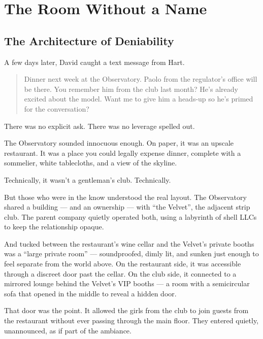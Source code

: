 
\section{The Room Without a Name}

\subsection{The Architecture of Deniability}

A few days later, David caught a text message from Hart.

\begin{quote}
  Dinner next week at the Observatory. Paolo from the regulator’s office will be there. You remember him from the club 
  last month? He’s already excited about the model. Want me to give him a heads-up so he’s primed for the conversation?
\end{quote}

There was no explicit ask. There was no leverage spelled out.

The Observatory sounded innocuous enough. On paper, it was an upscale restaurant. It was a place you could legally expense 
dinner, complete with a sommelier, white tablecloths, and a view of the skyline.  

Technically, it wasn’t a gentleman’s club. Technically.

But those who were in the know understood the real layout. The Observatory shared a building --- and an ownership --- with 
``the Velvet'', the adjacent strip club. The parent company quietly operated both, using a labyrinth of shell 
LLCs to keep the relationship opaque.

And tucked between the restaurant’s wine cellar and the Velvet’s private booths was a “large private room” — soundproofed, 
dimly lit, and sunken just enough to feel separate from the world above. On the restaurant side, it was accessible through 
a discreet door past the cellar. On the club side, it connected to a mirrored lounge behind the Velvet’s VIP booths — a 
room with a semicircular sofa that opened in the middle to reveal a hidden door.

That door was the point. It allowed the girls from the club to join guests from the restaurant without ever passing through 
the main floor. They entered quietly, unannounced, as if part of the ambiance. 

\medskip

